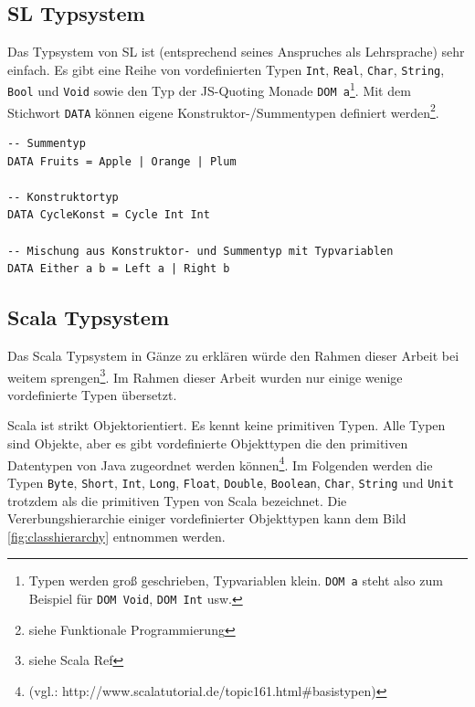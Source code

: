 \documentclass[12pt]{scrreprt}
\begin{document}
\subsection{SL Typsystem}

Das Typsystem von \ac{SL} ist (entsprechend seines Anspruches als Lehrsprache) sehr einfach. Es gibt eine Reihe von vordefinierten Typen \lstinline!Int!, \lstinline!Real!, \lstinline!Char!, \lstinline!String!, \lstinline!Bool! und \lstinline!Void! sowie den Typ der \ac{JS}-Quoting Monade \lstinline!DOM a!\footnote{Typen werden groß geschrieben, Typvariablen klein. \lstinline!DOM a! steht also zum Beispiel für \lstinline!DOM Void!, \lstinline!DOM Int! usw.}. Mit dem Stichwort \lstinline!DATA! können eigene Konstruktor-/Summentypen definiert werden\footnote{siehe Funktionale Programmierung}.

\begin{lstlisting}[caption=Beispiele für selbstdefinierte Datentypen in \ac{SL}, label=lst:bsp2]
-- Summentyp
DATA Fruits = Apple | Orange | Plum

-- Konstruktortyp
DATA CycleKonst = Cycle Int Int

-- Mischung aus Konstruktor- und Summentyp mit Typvariablen
DATA Either a b = Left a | Right b
\end{lstlisting}

\subsection{Scala Typsystem}

Das Scala Typsystem in Gänze zu erklären würde den Rahmen dieser Arbeit bei weitem sprengen\footnote{siehe Scala Ref}. Im Rahmen dieser Arbeit wurden nur einige wenige vordefinierte Typen übersetzt.

Scala ist strikt Objektorientiert. Es kennt keine primitiven Typen. Alle Typen sind Objekte, aber es gibt vordefinierte Objekttypen die den primitiven Datentypen von Java zugeordnet werden können\footnote{ (vgl.: http://www.scalatutorial.de/topic161.html\#basistypen)}. Im Folgenden werden die Typen \lstinline!Byte!, \lstinline!Short!, \lstinline!Int!, \lstinline!Long!, \lstinline!Float!, \lstinline!Double!, \lstinline!Boolean!, \lstinline!Char!, \lstinline!String! und \lstinline!Unit! trotzdem als die primitiven Typen von Scala bezeichnet. Die Vererbungshierarchie einiger vordefinierter Objekttypen kann dem Bild \ref{fig:classhierarchy} entnommen werden.
\end{document}
